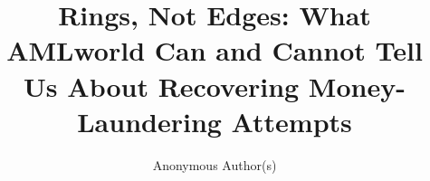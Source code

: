\documentclass[sigconf,review,anonymous]{acmart}
\begin{document}
\title{Rings, Not Edges: What AMLworld Can and Cannot Tell Us
About Recovering Money-Laundering Attempts}

\author{Anonymous Author(s)}


\maketitle











% 
\end{document}
